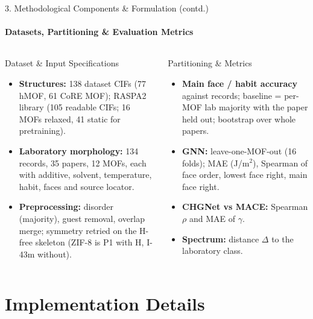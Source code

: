 \documentclass[aspectratio=169, 11pt]{beamer}
\begin{document}
\begin{frame}[shrink=6]{3. Methodological Components \& Formulation (contd.)}
    \framesubtitle{Datasets, Partitioning \& Evaluation Metrics}
    \begin{columns}[T]
        \begin{block}{Dataset \& Input Specifications}
            \scriptsize
            \begin{itemize}
                \item \textbf{Structures:} 138 dataset CIFs (77 hMOF, 61 CoRE MOF); RASPA2 library (105 readable CIFs; 16 MOFs relaxed, 41 static for pretraining).
                \item \textbf{Laboratory morphology:} 134 records, 35 papers, 12 MOFs, each with additive, solvent, temperature, habit, faces and source locator.
                \item \textbf{Preprocessing:} disorder (majority), guest removal, overlap merge; symmetry retried on the H-free skeleton (ZIF-8 is P1 with H, I-43m without).
            \end{itemize}
        \end{block}
        \begin{block}{Partitioning \& Metrics}
            \scriptsize
            \begin{itemize}
                \item \textbf{Main face / habit accuracy} against records; baseline = per-MOF lab majority with the paper held out; bootstrap over whole papers.
                \item \textbf{GNN:} leave-one-MOF-out (16 folds); MAE (J/m$^2$), Spearman of face order, lowest face right, main face right.
                \item \textbf{CHGNet vs MACE:} Spearman $\rho$ and MAE of $\gamma$.
                \item \textbf{Spectrum:} distance $\Delta$ to the laboratory class.
            \end{itemize}
        \end{block}
    \end{columns}
\end{frame}

\section{Implementation Details}
\end{document}
